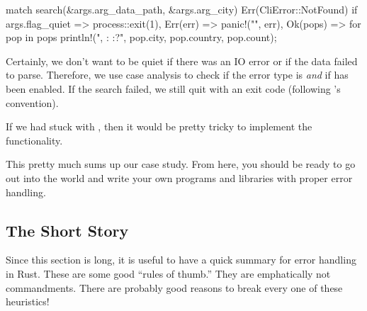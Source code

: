 \begin{rustc}
match search(&args.arg_data_path, &args.arg_city) {
    Err(CliError::NotFound) if args.flag_quiet => process::exit(1),
    Err(err) => panic!("{}", err),
    Ok(pops) => for pop in pops {
        println!("{}, {}: {:?}", pop.city, pop.country, pop.count);
    }
}
\end{rustc}

Certainly, we don't want to be quiet if there was an IO error or if the data failed to parse. Therefore, we use case 
analysis to check if the error type is  \emph{and} if  has been enabled. If the search failed, 
we still quit with an exit code (following 's convention).

\blank

If we had stuck with , then it would be pretty tricky to implement the  functionality.

\blank

This pretty much sums up our case study. From here, you should be ready to go out into the world and write your own 
programs and libraries with proper error handling.

\subsection*{The Short Story}

Since this section is long, it is useful to have a quick summary for error handling in Rust. These are some good 
\enquote{rules of thumb.} They are emphatically not commandments. There are probably good reasons to break every one 
of these heuristics!

